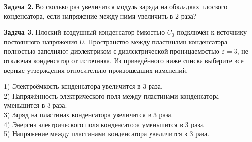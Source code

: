 \begin{taskbasic}[code={\label{task:elem_cap_v12_n11}}]
\textbf{Задача 2.} Во сколько раз увеличится модуль заряда на обкладках плоского конденсатора, если напряжение между ними увеличить в $2$ раза?

\end{taskbasic}

\begin{taskbasic}[code={\label{task:elem_cap_v15_n15}}]
\textbf{Задача 3.} Плоский воздушный конденсатор ёмкостью $C_0$ подключён к источнику постоянного напряжения $U$. Пространство между пластинами конденсатора полностью заполняют диэлектриком с диэлектрической проницаемостью $\varepsilon = 3$, не отключая конденсатор от источника. Из приведённого ниже списка выберите все верные утверждения относительно произошедших изменений.

\nopagebreak\smallskip
\begin{center}
\end{center}

1) Электроёмкость конденсатора увеличится в $3$ раза.\\
2) Напряжённость электрического поля между пластинами конденсатора уменьшится в $3$ раза.\\
3) Заряд на пластинах конденсатора увеличится в $3$ раза.\\
4) Энергия электрического поля конденсатора уменьшится в $3$ раза.\\
5) Напряжение между пластинами конденсатора увеличится в $3$ раза.

\end{taskbasic}

